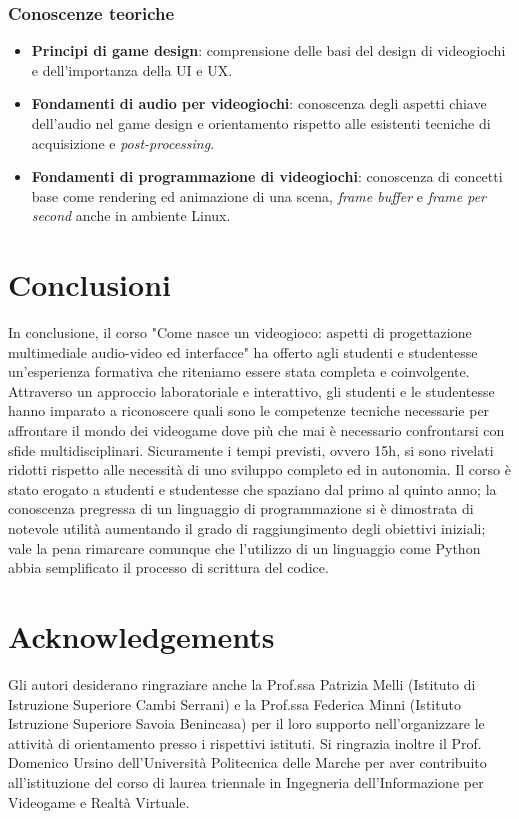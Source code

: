 \documentclass{easychair}
\begin{document}
\subsubsection{Conoscenze teoriche}
\begin{itemize}
    \item \textbf{Principi di game design}: comprensione delle basi del design di videogiochi e dell'importanza della UI e UX.
    \item \textbf{Fondamenti di audio per videogiochi}: conoscenza degli aspetti chiave dell'audio nel game design e orientamento rispetto alle esistenti tecniche di acquisizione e \textit{post-processing}.
    \item \textbf{Fondamenti di programmazione di videogiochi}: conoscenza di concetti base come rendering ed animazione di una scena, \textit{frame buffer} e \textit{frame per second} anche in ambiente Linux.
\end{itemize}
\section{Conclusioni}
\label{sec:conclusioni}

In conclusione, il corso "Come nasce un videogioco: aspetti di progettazione multimediale audio-video ed interfacce" ha offerto agli studenti e studentesse un'esperienza formativa che riteniamo essere stata completa e coinvolgente. Attraverso un approccio laboratoriale e interattivo, gli studenti e le studentesse hanno imparato a riconoscere quali sono le competenze tecniche necessarie per affrontare il mondo dei videogame dove più che mai è necessario confrontarsi con sfide multidisciplinari. Sicuramente i tempi previsti, ovvero 15h, si sono rivelati ridotti rispetto alle necessità di uno sviluppo completo ed in autonomia. Il corso è stato erogato a studenti e studentesse che spaziano dal primo al quinto anno; la conoscenza pregressa di un linguaggio di programmazione si è dimostrata di notevole utilità aumentando il grado di raggiungimento degli obiettivi iniziali; vale la pena rimarcare comunque che l'utilizzo di un linguaggio come Python abbia semplificato il processo di scrittura del codice.

\section*{Acknowledgements}
Gli autori desiderano ringraziare anche la Prof.ssa Patrizia Melli (Istituto di Istruzione Superiore Cambi Serrani) e la Prof.ssa Federica Minni (Istituto Istruzione Superiore Savoia Benincasa) per il loro supporto nell'organizzare le attività di orientamento presso i rispettivi istituti. Si ringrazia inoltre il Prof. Domenico Ursino dell'Università Politecnica delle Marche per aver contribuito all'istituzione del corso di laurea triennale in Ingegneria dell'Informazione per Videogame e Realtà Virtuale.

\label{sect:bib}

%
%
%

\end{document}
